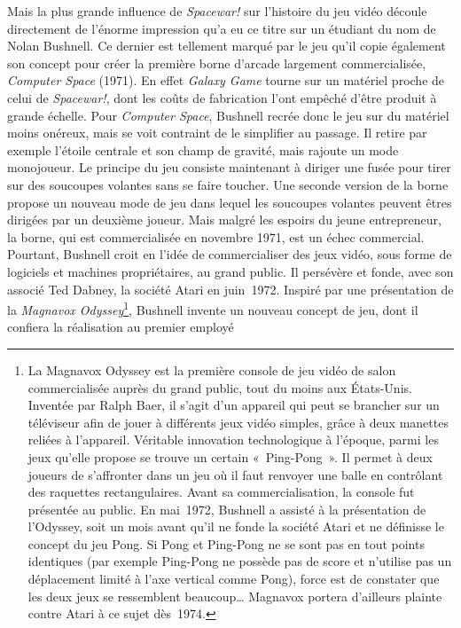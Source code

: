 \documentclass{FramateX}
\begin{document}
\begin{refsection}
Mais la plus grande influence de \textit{Spacewar!} sur l'histoire du jeu
vidéo découle directement de l'énorme impression qu'a eu ce titre sur
un étudiant du nom de Nolan Bushnell. Ce dernier est tellement marqué
par le jeu qu'il copie également son concept pour créer la première
borne d'arcade largement commercialisée, \textit{Computer Space} (1971). En effet \textit{Galaxy Game} tourne sur un matériel proche
de celui de \textit{Spacewar!}, dont les
coûts de fabrication l'ont empêché d'être produit à grande échelle.
Pour \textit{Computer Space}, Bushnell recrée
donc le jeu sur du matériel moins onéreux, mais se voit contraint de le
simplifier au passage. Il retire par exemple l'étoile centrale et son
champ de gravité, mais rajoute un mode monojoueur. Le principe du jeu
consiste maintenant à diriger une fusée pour tirer sur des soucoupes
volantes sans se faire toucher. Une seconde version de la borne propose
un nouveau mode de jeu dans lequel les soucoupes volantes peuvent êtres
dirigées par un deuxième joueur. Mais malgré les espoirs du jeune
entrepreneur, la borne, qui est commercialisée en novembre 1971, est un
échec commercial. Pourtant, Bushnell croit en l'idée de commercialiser
des jeux vidéo, sous forme de logiciels et machines propriétaires, au
grand public. Il persévère et fonde, avec son associé Ted Dabney, la
société Atari en juin~1972. Inspiré
par une présentation de la \textit{Magnavox
Odyssey}\footnote{La Magnavox Odyssey est
la première console de jeu vidéo de salon commercialisée auprès du
grand public, tout du moins aux États-Unis. Inventée par Ralph Baer, il
s'agit d'un appareil qui peut se brancher sur un téléviseur afin de
jouer à différents jeux vidéo simples, grâce à deux manettes reliées à
l'appareil. Véritable innovation technologique à l'époque, parmi les
jeux qu'elle propose se trouve un certain «~Ping-Pong~». Il permet à
deux joueurs de s'affronter dans un jeu où il faut renvoyer une balle
en contrôlant des raquettes rectangulaires. Avant sa commercialisation,
la console fut présentée au public. En mai~1972, Bushnell a assisté à
la présentation de l'Odyssey, soit un mois avant qu'il ne fonde la
société Atari et ne définisse le concept du jeu Pong. Si Pong et
Ping-Pong ne se sont pas en tout points identiques
 (par exemple Ping-Pong ne possède pas
de score et n'utilise pas un déplacement limité à l'axe vertical comme
Pong), force est de constater que les deux jeux se ressemblent
beaucoup… Magnavox portera d'ailleurs plainte contre Atari à ce sujet
dès~1974.}, Bushnell invente un nouveau concept de jeu, dont il
confiera la réalisation au premier employé

\end{refsection}
\end{document}
